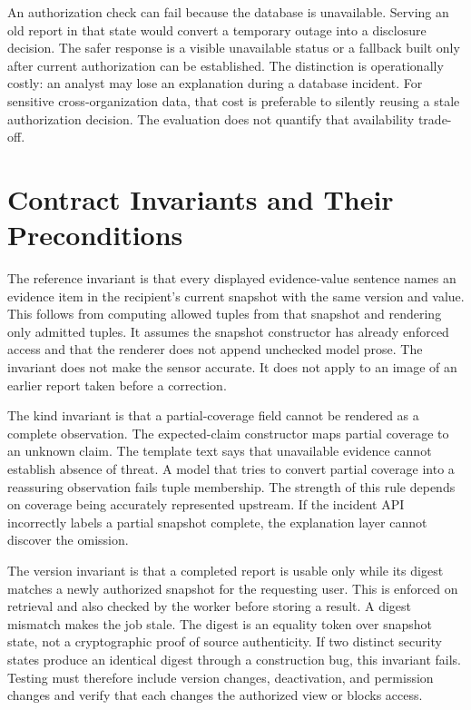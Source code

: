 An authorization check can fail because the database is unavailable. Serving an old report in that state would convert a temporary outage into a disclosure decision. The safer response is a visible unavailable status or a fallback built only after current authorization can be established. The distinction is operationally costly: an analyst may lose an explanation during a database incident. For sensitive cross-organization data, that cost is preferable to silently reusing a stale authorization decision. The evaluation does not quantify that availability trade-off.

\section{Contract Invariants and Their Preconditions}
The reference invariant is that every displayed evidence-value sentence names an evidence item in the recipient's current snapshot with the same version and value. This follows from computing allowed tuples from that snapshot and rendering only admitted tuples. It assumes the snapshot constructor has already enforced access and that the renderer does not append unchecked model prose. The invariant does not make the sensor accurate. It does not apply to an image of an earlier report taken before a correction.

The kind invariant is that a partial-coverage field cannot be rendered as a complete observation. The expected-claim constructor maps partial coverage to an unknown claim. The template text says that unavailable evidence cannot establish absence of threat. A model that tries to convert partial coverage into a reassuring observation fails tuple membership. The strength of this rule depends on coverage being accurately represented upstream. If the incident API incorrectly labels a partial snapshot complete, the explanation layer cannot discover the omission.

The version invariant is that a completed report is usable only while its digest matches a newly authorized snapshot for the requesting user. This is enforced on retrieval and also checked by the worker before storing a result. A digest mismatch makes the job stale. The digest is an equality token over snapshot state, not a cryptographic proof of source authenticity. If two distinct security states produce an identical digest through a construction bug, this invariant fails. Testing must therefore include version changes, deactivation, and permission changes and verify that each changes the authorized view or blocks access.

